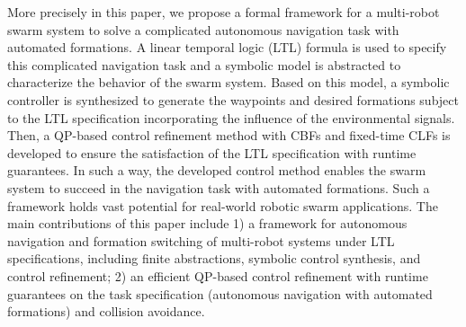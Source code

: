 \documentclass[letterpaper, 10 pt, conference]{ieeeconf}
\begin{document}
More precisely in this paper, we propose a formal framework for a multi-robot swarm system to solve a complicated autonomous navigation task with automated formations. A linear temporal logic (LTL) formula is used to specify this complicated navigation task and a symbolic model is abstracted to characterize the behavior of the swarm system. Based on this model, a symbolic controller is synthesized to generate the waypoints and desired formations subject to the LTL specification incorporating the influence of the environmental signals. Then, a QP-based control refinement method with CBFs and fixed-time CLFs is developed to ensure the satisfaction of the LTL specification with runtime guarantees. In such a way, the developed control method enables the swarm system to succeed in the navigation task with automated formations. Such a framework holds vast potential for real-world robotic swarm applications. The main contributions of this paper include 1) a framework for autonomous navigation and formation switching of multi-robot systems under LTL specifications, including finite abstractions, symbolic control synthesis, and control refinement; 2) an efficient QP-based control refinement with runtime guarantees on the task specification (autonomous navigation with automated formations) and collision avoidance.



\end{document}
